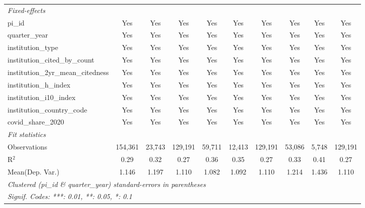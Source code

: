 \begin{tabular}{lccccccccc}
   \midrule
   \emph{Fixed-effects}\\
   pi\_id                                                      & Yes           & Yes           & Yes           & Yes            & Yes          & Yes           & Yes           & Yes            & Yes\\  
   quarter\_year                                               & Yes           & Yes           & Yes           & Yes            & Yes          & Yes           & Yes           & Yes            & Yes\\  
   institution\_type                                           & Yes           & Yes           & Yes           & Yes            & Yes          & Yes           & Yes           & Yes            & Yes\\  
   institution\_cited\_by\_count                               & Yes           & Yes           & Yes           & Yes            & Yes          & Yes           & Yes           & Yes            & Yes\\  
   institution\_2yr\_mean\_citedness                           & Yes           & Yes           & Yes           & Yes            & Yes          & Yes           & Yes           & Yes            & Yes\\  
   institution\_h\_index                                       & Yes           & Yes           & Yes           & Yes            & Yes          & Yes           & Yes           & Yes            & Yes\\  
   institution\_i10\_index                                     & Yes           & Yes           & Yes           & Yes            & Yes          & Yes           & Yes           & Yes            & Yes\\  
   institution\_country\_code                                  & Yes           & Yes           & Yes           & Yes            & Yes          & Yes           & Yes           & Yes            & Yes\\  
   covid\_share\_2020                                          & Yes           & Yes           & Yes           & Yes            & Yes          & Yes           & Yes           & Yes            & Yes\\  
   \midrule
   \emph{Fit statistics}\\
   Observations                                                & 154,361       & 23,743        & 129,191       & 59,711         & 12,413       & 129,191       & 53,086        & 5,748          & 129,191\\  
   R$^2$                                                       & 0.29          & 0.32          & 0.27          & 0.36           & 0.35         & 0.27          & 0.33          & 0.41           & 0.27\\  
Mean(Dep. Var.) & 1.146 & 1.197 & 1.110 & 1.082 & 1.092 & 1.110 & 1.214 & 1.436 & 1.110 \\
   \midrule \midrule
   \multicolumn{10}{l}{\emph{Clustered (pi\_id \& quarter\_year) standard-errors in parentheses}}\\
   \multicolumn{10}{l}{\emph{Signif. Codes: ***: 0.01, **: 0.05, *: 0.1}}\\
\end{tabular}
\par\endgroup
